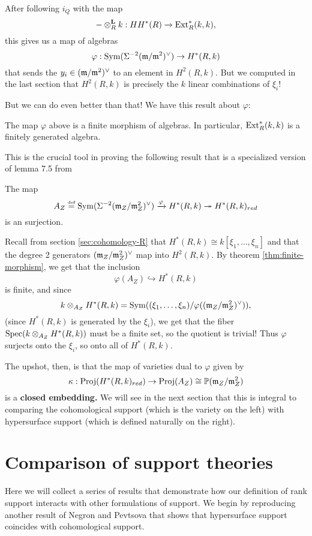 \documentclass [11pt, proquest] {uwthesis}[2020/02/24]
\begin{document}
    After following $i_Q$ with the map \cite[eq. 10]{negron-pevtsovaII}
    \[-\otimes_R^\textbf{L}k:HH^\ast(R)\to \operatorname{Ext}_R^\ast(k,k),\]
    this gives us a map of algebras
    \[\varphi:\operatorname{Sym}(\Sigma^{-2}(\mathfrak{m}/\mathfrak{m}^2)^\vee)\to H^\ast(R,k)\]
    that sends the $y_i\in(\mathfrak{m}/\mathfrak{m}^2)^\vee$ to an element in $H^2(R,k).$ But we computed in the last section that $H^2(R,k)$ is precisely the $k$ linear combinations of $\xi_i!$ 
    
    But we can do even better than that! We have this result about $\varphi:$
    \begin{thm}\label{thm:finite-morphism}
        The map $\varphi$ above is a finite morphism of algebras. In particular, $\operatorname{Ext}_R^\ast(k,k)$ is a finitely generated algebra.
    \end{thm}
    This is the crucial tool in proving the following result that is a specialized version of lemma 7.5 from \cite{negron-pevtsovaII}
    \begin{lem}
        The map 
        \[A_Z\stackrel{\text{\tiny def}}{=}\operatorname{Sym}(\Sigma^{-2}(\mathfrak{m}_Z/\mathfrak{m}_Z^2)^\vee)\xrightarrow{\varphi} H^\ast(R,k)\twoheadrightarrow H^\ast(R,k)_{red}\]
        is an surjection.
    \end{lem}
    \begin{prf}
        Recall from section \ref{sec:cohomology-R} that $H^\ast(R,k)\cong k[\xi_1,\dots,\xi_n]$ and that the degree 2 generators $(\mathfrak{m}_Z/\mathfrak{m}_Z^2)^\vee$ map into $H^2(R,k).$ By theorem \ref{thm:finite-morphism}, we get that the inclusion
        \[\varphi(A_Z)\hookrightarrow H^\ast(R,k)\]
        is finite, and since 
        \[k\otimes_{A_Z}H^\ast(R,k)=\operatorname{Sym}((\xi_1,\dots,\xi_n)/\varphi((\mathfrak{m}_Z/\mathfrak{m}_Z^2)^\vee)),\]
        (since $H^\ast(R,k)$ is generated by the $\xi_i$), we get that the fiber $\operatorname{Spec}(k\otimes_{A_Z}H^\ast(R,k))$ must be a finite set, so the quotient is trivial! Thus $\varphi$ surjects onto the $\xi_i$, so onto all of $H^\ast(R,k).$
    \end{prf}
    
    The upshot, then, is that the map of varieties dual to $\varphi$ given by 
    \[\kappa:\operatorname{Proj}(H^\ast(R,k)_{red})\to \operatorname{Proj}(A_Z)\cong \mathbb{P}(\mathfrak{m}_Z/\mathfrak{m}_Z^2)\]
    is a \textbf{closed embedding.} We will see in the next section that this is integral to comparing the cohomological support (which is the variety on the left) with hypersurface support (which is defined naturally on the right).

\section{Comparison of support theories}
    Here we will collect a series of results that demonstrate how our definition of rank support interacts with other formulations of support. We begin by reproducing another result of Negron and Pevtsova that shows that hypersurface support coincides with cohomological support.
    
\end{document}
